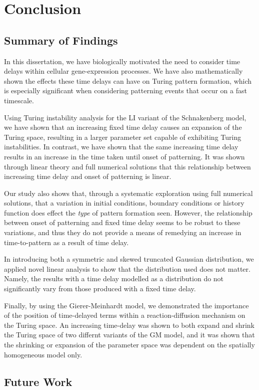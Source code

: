\chapter{Conclusion}
\section{Summary of Findings}
In this dissertation, we have biologically motivated the need to consider time delays within cellular gene-expression processes. We have also mathematically shown the effects these time delays can have on Turing pattern formation, which is especially significant when considering patterning events that occur on a fast timescale.

Using Turing instability analysis for the LI variant of the Schnakenberg model, we have shown that an increasing fixed time delay causes an expansion of the Turing space, resulting in a larger parameter set capable of exhibiting Turing instabilities. In contrast, we have shown that the same increasing time delay results in an increase in the time taken until onset of patterning. It was shown through linear theory and full numerical solutions that this relationship between increasing time delay and onset of patterning is linear.

Our study also shows that, through a systematic exploration using full numerical solutions, that a variation in initial conditions, boundary conditions or history function does effect the \textit{type} of pattern formation seen. However, the relationship between onset of patterning and fixed time delay seems to be robust to these variations, and thus they do not provide a means of remedying an increase in time-to-pattern as a result of time delay.

In introducing both a symmetric and skewed truncated Gaussian distribution, we applied novel linear analysis to show that the distribution used does not matter. Namely, the results with a time delay modelled as a distribution do not significantly vary from those produced with a fixed time delay.

Finally, by using the Gierer-Meinhardt model, we demonstrated the importance of the position of time-delayed terms within a reaction-diffusion mechanism on the Turing space. An increasing time-delay was shown to both expand and shrink the Turing space of two differnt variants of the GM model, and it was shown that the shrinking or expansion of the parameter space was dependent on the spatially homogeneous model only.

\section{Future Work}
